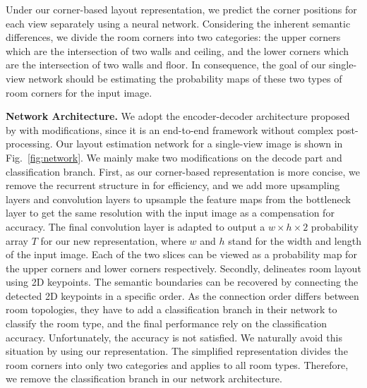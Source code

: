 %
 
 
Under our corner-based layout representation, we predict the corner positions for each view separately using a neural network. 
Considering the inherent semantic differences, we divide the room corners into two categories: the upper corners which are the intersection of two walls and ceiling, and the lower corners which are the intersection of two walls and floor. 
In consequence, the goal of our single-view network should be estimating the probability maps of these two types of room corners for the input image.

\noindent\textbf{Network Architecture.}
We adopt the encoder-decoder architecture proposed by \cite{LeeRoomNet17} with modifications, since it is an end-to-end framework without complex post-processing. 
%
Our layout estimation network for a single-view image is shown in Fig.~\ref{fig:network}. 
We mainly make two modifications on the decode part and classification branch. 
First, as our corner-based representation is more concise, we remove the recurrent structure in \cite{LeeRoomNet17} for efficiency, and we add more upsampling layers and convolution layers to upsample the feature maps from the bottleneck layer to get the same resolution with the input image as a compensation for accuracy. 
The final convolution layer is adapted to output a $w \times h \times 2$ probability array $T$ for our new representation, where $w$ and $h$ stand for the width and length of the input image. 
Each of the two slices can be viewed as a probability map for the upper corners and lower corners respectively. 
Secondly, \cite{LeeRoomNet17} delineates room layout using 2D keypoints. The semantic boundaries can be recovered by connecting the detected 2D keypoints in a specific order. 
As the connection order differs between room topologies, they have to add a classification branch in their network to classify the room type, and the final performance rely on the classification accuracy. 
Unfortunately, the accuracy is not satisfied. 
We naturally avoid this situation by using our representation. The simplified representation divides the room corners into only two categories and applies to all room types. 
Therefore, we remove the classification branch in our network architecture.
 
